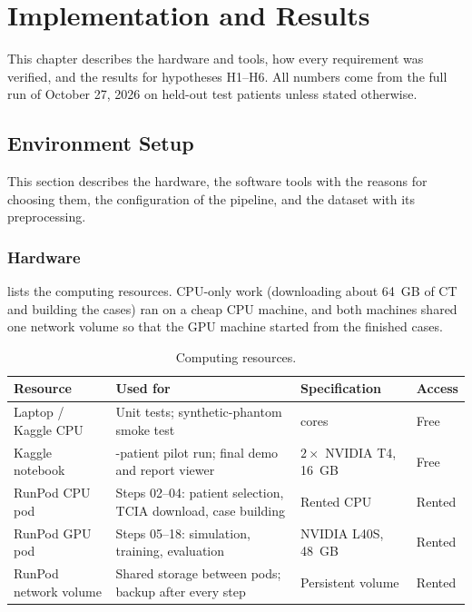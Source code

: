 \chapter{Implementation and Results}
\label{ch:results}

This chapter describes the hardware and tools, how every requirement was verified, and the results for hypotheses H1--H6. All numbers come from the full run of October 27, 2026 on held-out test patients unless stated otherwise.

\section{Environment Setup}

This section describes the hardware, the software tools with the reasons for choosing them, the configuration of the pipeline, and the dataset with its preprocessing.

\subsection{Hardware}
  lists the computing resources. CPU-only work (downloading about 64~GB of CT and building the cases) ran on a cheap CPU machine, and both machines shared one network volume so that the GPU machine started from the finished cases.

\begin{table}[!htbp]
\centering\small
\caption{Computing resources.}
\label{tab:hardware}
\begin{tabularx}{\linewidth}{>{\raggedright\arraybackslash}p{3.3cm} >{\raggedright\arraybackslash}X >{\raggedright\arraybackslash}p{3.0cm} >{\raggedright\arraybackslash}p{1.8cm}}
\toprule
Resource & Used for & Specification & Access \\
\midrule
Laptop / Kaggle CPU & Unit tests; synthetic-phantom smoke test & 4 cores & Free \\
Kaggle notebook & 40-patient pilot run; final demo and report viewer & $2\times$ NVIDIA T4, 16~GB & Free \\
RunPod CPU pod & Steps 02--04: patient selection, TCIA download, case building & Rented CPU & Rented \\
RunPod GPU pod & Steps 05--18: simulation, training, evaluation & NVIDIA L40S, 48~GB & Rented \\
RunPod network volume & Shared storage between pods; backup after every step & Persistent volume & Rented \\
\bottomrule
\end{tabularx}
\end{table}

